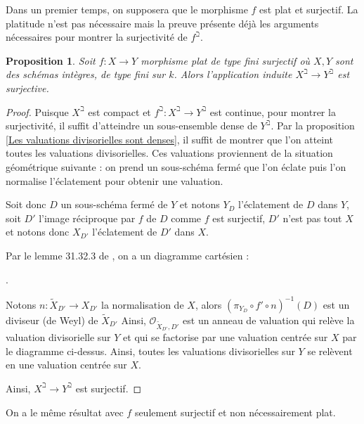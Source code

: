 \documentclass[11pt]{article}
\newtheorem{prop}[thm]{Proposition}
\begin{document}
Dans un premier temps, on supposera que le morphisme $f$ est plat et surjectif. La platitude n'est pas nécessaire mais la preuve présente déjà les arguments nécessaires pour montrer la surjectivité de $f^\beth$.  

\begin{prop}\label{si le morphisme est plat, surjectivité des beth}
Soit $f : X \rightarrow Y$ morphisme plat de type fini surjectif où $X, Y$ sont des schémas intègres, de type fini sur $k$. Alors l'application induite $X^\beth \rightarrow Y^\beth$ est surjective. 
\end{prop}

\begin{proof}
Puisque $X^\beth$ est compact et $f^\beth :  X^\beth \rightarrow Y^\beth$ est continue, pour montrer la surjectivité, il suffit d'atteindre un sous-ensemble dense de $Y^\beth$. Par la proposition \ref{Les valuations divisorielles sont denses}, il suffit de montrer que l'on atteint toutes les valuations divisorielles. Ces valuations proviennent de la situation géométrique suivante : on prend un sous-schéma fermé que l'on éclate puis l'on normalise l'éclatement pour obtenir une valuation.

Soit donc $D$ un sous-schéma fermé de $Y$ et notons $Y_D$ l'éclatement de $D$ dans $Y$, soit $D'$ l'image réciproque par $f$ de $D$ comme $f$ est surjectif, $D'$ n'est pas tout $X$ et notons donc $X_{D'}$ l'éclatement de $D'$ dans $X$.

Par le lemme 31.32.3 de \cite{stacks-project}, on a un diagramme cartésien :
.

Notons $n : \tilde{X}_{D'} \rightarrow X_{D'}$ la normalisation de $X$, alors $(\pi_{Y_D} \circ f' \circ n)^{-1}(D)$ est un diviseur (de Weyl) de $\tilde{X}_{D'}$ Ainsi, $\mathcal{O}_{\tilde{X}_{D'}, D'}$ est un anneau de valuation qui relève la valuation divisorielle sur $Y$ et qui se factorise par une valuation centrée sur $X$ par le diagramme ci-dessus. Ainsi, toutes les valuations divisorielles sur $Y$ se relèvent en une valuation centrée sur $X$.

Ainsi, $X^\beth \rightarrow Y^\beth$ est surjectif.
\end{proof}

On a le même résultat avec $f$ seulement surjectif et non nécessairement plat. 
\end{document}
